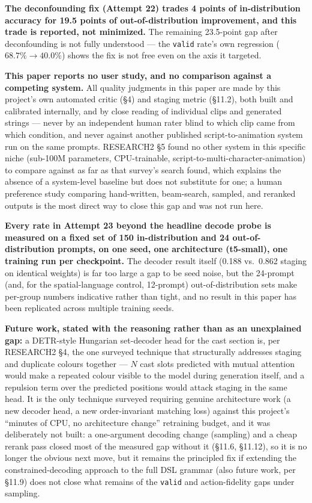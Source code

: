 \documentclass[11pt]{article}
\newcommand{\secsym}{\S}
\begin{document}
\textbf{The deconfounding fix (Attempt 22) trades 4 points of
in-distribution accuracy for 19.5 points of out-of-distribution
improvement, and this trade is reported, not minimized.} The remaining
23.5-point gap after deconfounding is not fully understood --- the
\texttt{valid} rate's own regression ($68.7\% \rightarrow 40.0\%$) shows
the fix is not free even on the axis it targeted.

\textbf{This paper reports no user study, and no comparison against a
competing system.} All quality judgments in this paper are made by this
project's own automated critic (\secsym4) and staging metric
(\secsym11.2), both built and calibrated internally, and by close reading
of individual clips and generated strings --- never by an independent
human rater blind to which clip came from which condition, and never
against another published script-to-animation system run on the same
prompts. RESEARCH2 \secsym5 found no other system in this specific niche
(sub-100M parameters, CPU-trainable, script-to-multi-character-animation)
to compare against as far as that survey's search found, which explains
the absence of a system-level baseline but does not substitute for one; a
human preference study comparing hand-written, beam-search, sampled, and
reranked outputs is the most direct way to close this gap and was not run
here.

\textbf{Every rate in Attempt 23 beyond the headline decode probe is
measured on a fixed set of 150 in-distribution and 24
out-of-distribution prompts, on one seed, one architecture (t5-small),
one training run per checkpoint.} The decoder result itself (0.188 vs.\
0.862 staging on identical weights) is far too large a gap to be seed
noise, but the 24-prompt (and, for the spatial-language control,
12-prompt) out-of-distribution sets make per-group numbers indicative
rather than tight, and no result in this paper has been replicated
across multiple training seeds.

\textbf{Future work, stated with the reasoning rather than as an
unexplained gap:} a DETR-style Hungarian set-decoder head
\cite{carion2020detr} for the cast section is, per RESEARCH2 \secsym4,
the one surveyed technique that structurally addresses staging and
duplicate colours together --- $N$ cast slots predicted with mutual
attention would make a repeated colour visible to the model during
generation itself, and a repulsion term over the predicted positions
would attack staging in the same head. It is the only technique surveyed
requiring genuine architecture work (a new decoder head, a new
order-invariant matching loss) against this project's ``minutes of CPU,
no architecture change'' retraining budget, and it was deliberately not
built: a one-argument decoding change (sampling) and a cheap rerank pass
closed most of the measured gap without it (\secsym11.6, \secsym11.12),
so it is no longer the obvious next move, but it remains the principled
fix if extending the constrained-decoding approach to the full DSL
grammar (also future work, per \secsym11.9) does not close what remains
of the \texttt{valid} and action-fidelity gaps under sampling.
\end{document}
